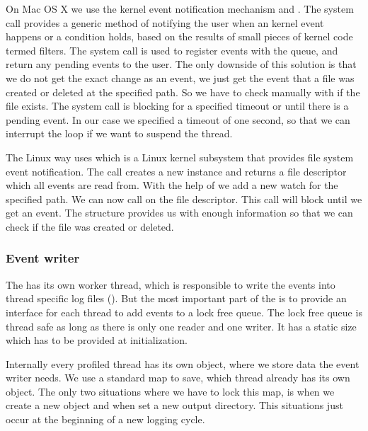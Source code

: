 On Mac OS X we use the kernel event notification mechanism  and . The  system call provides a generic method of notifying the user when an kernel event happens or a condition holds, based on the results of small pieces of kernel code termed filters. The  system call is used to register events with the queue, and return any pending events to the user. The only downside of this solution is that we do not get the exact change as an event, we just get the event that a file was created or deleted at the specified path. So we have to check manually with  if the file exists. The  system call is blocking for a specified timeout or until there is a pending event. In our case we specified a timeout of one second, so that we can interrupt the loop if we want to suspend the  thread.

The Linux way uses  which is a Linux kernel subsystem that provides file system event notification. The  call creates a new instance and returns a file descriptor which all events are read from. With the help of  we add a new watch for the specified path. We can now call  on the file descriptor. This call will block until we get an event. The  structure provides us with enough information so that we can check if the  file was created or deleted.

\subsubsection{Event writer} 

The  has its own worker thread, which is responsible to write the events into thread specific log files (). But the most important part of the  is to provide an interface for each thread to add events to a lock free queue. The lock free queue is thread safe as long as there is only one reader and one writer. It has a static size which has to be provided at initialization.

Internally every profiled thread has its own  object, where we store data the event writer needs. We use a standard map to save, which thread already has its own  object. The only two situations where we have to lock this map, is when we create a new  object and when set a new output directory. This situations just occur at the beginning of a new logging cycle.

